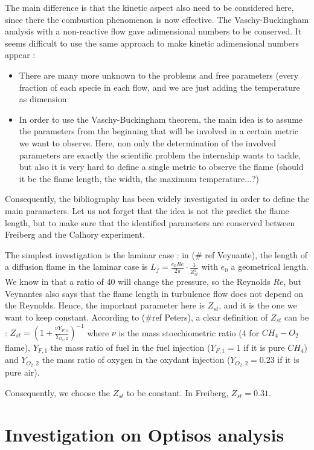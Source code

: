 The main difference is that the kinetic aspect also need to be considered here, since there the combustion phenomenon is now effective. The Vaschy-Buckingham analysis with a non-reactive flow  gave adimensional numbers to be conserved. It seems difficult to use the same approach to make kinetic adimensional numbers appear :

\begin{itemize}
\item There are many more unknown to the problems and free parameters (every fraction of each specie in each flow, and we are just adding the temperature as dimension
\item In order to use the Vaschy-Buckingham theorem, the main idea is to assume the parameters from the beginning that will be involved in a certain metric we want to observe. Here, non only the determination of the  involved parameters are exactly the scientific problem the internship wants to tackle, but also it is very hard to define a single metric to observe the flame (should it be the flame length, the width, the maximum temperature...?)
\end{itemize}
Consequently, the bibliography has been widely investigated in order to define the main parameters. Let us not forget that the idea is not the predict the flame length, but to make sure that the identified parameters are conserved between Freiberg and the Calhory experiment.

The simplest investigation is the laminar case : in (\# ref Veynante), the length of a diffusion flame in the laminar case is $L_{f}=\frac{e_{0}Re}{2\pi}\cdot \frac{1}{Z_{st}^2}$  with $e_{0}$ a geometrical length. We know in that a ratio of 40 will change the pressure, so the Reynolds $Re$, but Veynantes also says that the flame length in turbulence flow does not depend on the Reynolds. Hence, the important parameter here is $Z_{st}$, and it is the one we want to keep constant. According to (\#ref Peters), a clear definition of $Z_{st}$ can be : $Z_{st}=(1+\frac{\nu Y_{F,1}}{Y_{O_{2},2}})^{-1}$ where $\nu$ is the mass stoechiometric ratio (4 for $CH_{4}-O_{2}$ flame),    $Y_{F,1}$ the mass ratio of fuel in the fuel injection ($Y_{F,1}=1$ if it is pure $CH_{4}$) and $Y_{O_{2},2}$ the mass ratio of oxygen in the oxydant injection ($Y_{O_{2},2}=0.23$ if it is pure air).

Consequently, we choose the $Z_{st}$ to be constant. In Freiberg, $Z_{st}=0.31$.


\newpage

\section{Investigation on Optisos analysis }

